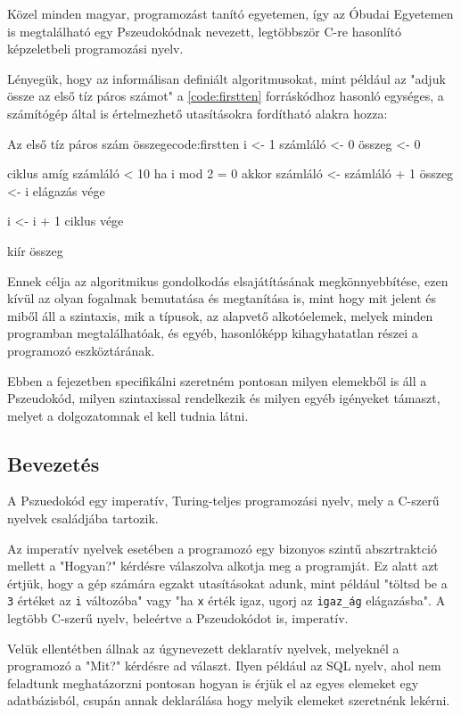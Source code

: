 Közel minden magyar, programozást tanító egyetemen, így az Óbudai Egyetemen is megtalálható egy Pszeudokódnak nevezett, legtöbbször C-re hasonlító képzeletbeli programozási nyelv. 

Lényegük, hogy az informálisan definiált algoritmusokat, mint például az "adjuk össze az első tíz páros számot" a \ref{code:firstten} forráskódhoz hasonló egységes, a számítógép által is értelmezhető utasításokra fordítható alakra hozza:

\begin{code}{Az első tíz páros szám összege}{code:firstten}
i <- 1
számláló <- 0
összeg <- 0

ciklus amíg számláló < 10
    ha i mod 2 = 0 akkor
        számláló <- számláló + 1
        összeg <- i
    elágazás vége

    i <- i + 1
ciklus vége

kiír összeg
\end{code}

Ennek célja az algoritmikus gondolkodás elsajátításának megkönnyebbítése, ezen kívül az olyan fogalmak bemutatása és megtanítása is, mint hogy mit jelent és miből áll a szintaxis, mik a típusok, az alapvető alkotóelemek, melyek minden programban megtalálhatóak, és egyéb, hasonlóképp kihagyhatatlan részei a programozó eszköztárának.

Ebben a fejezetben specifikálni szeretném pontosan milyen elemekből is áll a Pszeudokód, milyen szintaxissal rendelkezik és milyen egyéb igényeket támaszt, melyet a dolgozatomnak el kell tudnia látni.

\subsection{Bevezetés}

A Pszuedokód egy imperatív, Turing-teljes programozási nyelv, mely a C-szerű nyelvek családjába tartozik.

Az imperatív nyelvek esetében a programozó egy bizonyos szintű abszrtraktció mellett a "Hogyan?" kérdésre válaszolva alkotja meg a programját. Ez alatt azt értjük, hogy a gép számára egzakt utasításokat adunk, mint például "töltsd be a \texttt{3} értéket az \texttt{i} változóba" vagy "ha \texttt{x} érték igaz, ugorj az \texttt{igaz\_ág} elágazásba". A legtöbb C-szerű nyelv, beleértve a Pszeudokódot is, imperatív.

Velük ellentétben állnak az úgynevezett deklaratív nyelvek, melyeknél a programozó a "Mit?" kérdésre ad választ. Ilyen például az SQL nyelv, ahol nem feladtunk meghatázorzni pontosan hogyan is érjük el az egyes elemeket egy adatbázisból, csupán annak deklarálása hogy melyik elemeket szeretnénk lekérni.

